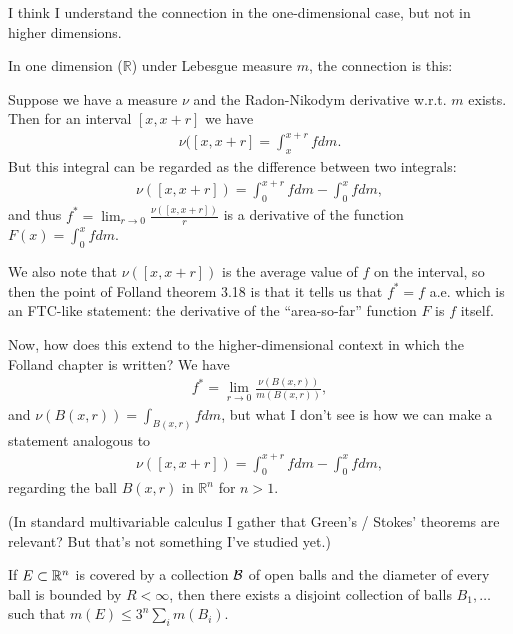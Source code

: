 \begin{question*}
  I think I understand the connection in the one-dimensional case, but not in higher dimensions.

  In one dimension ($\mathbb{R}$) under Lebesgue measure $m$, the connection is this:

  Suppose we have a measure $\nu$ and the Radon-Nikodym derivative w.r.t. $m$ exists. Then for an interval $[x, x + r]$ we have
  \begin{align*}
    \nu([x,x + r] = \int_{x}^{x+r} f dm.
  \end{align*}
  But this integral can be regarded as the difference between two integrals:
  \begin{align*}
    \nu([x, x + r]) = \int_0^{x + r} f dm - \int_0^{x} f dm,
  \end{align*}
  and thus $f^* = \lim_{r \to 0}\frac{\nu([x,x + r])}{r}$ is a derivative of the function $F(x) = \int_0^x f dm$.

  We also note that $\nu([x, x + r])$ is the average value of $f$ on the interval, so then the point of Folland
  theorem 3.18 is that it tells us that $f^* = f$ a.e. which is an FTC-like statement: the derivative of the
  ``area-so-far​'' function $F$ is $f$ itself.

  Now, how does this extend to the higher-dimensional context in which the Folland chapter is written? We have
  \begin{align*}
    f^* = \lim_{r \to 0} \frac{\nu(B(x, r))}{m(B(x, r))},
  \end{align*}
  and $\nu(B(x, r)) = \int_{B(x, r)} f dm$, but what I don't see is how we can make a statement analogous to
  \begin{align*}
    \nu([x, x + r]) = \int_0^{x + r} f dm - \int_0^{x} f dm,
  \end{align*}
  regarding the ball $B(x, r)$ in $\mathbb{R}^n$ for $n > 1$.

  (In standard multivariable calculus I gather that Green's / Stokes' theorems are relevant? But that's not something I've studied yet.)
\end{question*}


\begin{lemma}
  If $E \subset \mathbb{R}^n$ is covered by a collection $\mathcal B$ of open balls and the diameter of every ball is
  bounded by $R < \infty$, then there exists a disjoint collection of balls $B_1, \ldots$ such
  that $m(E) \leq 3^n \sum_i m(B_i)$.
\end{lemma}

